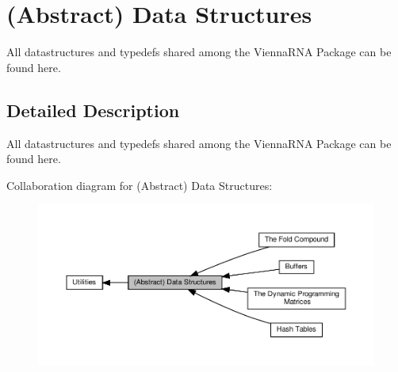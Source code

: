 \hypertarget{group__data__structures}{}\section{(Abstract) Data Structures}
\label{group__data__structures}


All datastructures and typedefs shared among the Vienna\+R\+NA Package can be found here.  




\subsection{Detailed Description}
All datastructures and typedefs shared among the Vienna\+R\+NA Package can be found here. 

Collaboration diagram for (Abstract) Data Structures\+:
\nopagebreak
\begin{figure}[H]
\begin{center}
\leavevmode
\includegraphics[width=350pt]{group__data__structures}
\end{center}
\end{figure}
